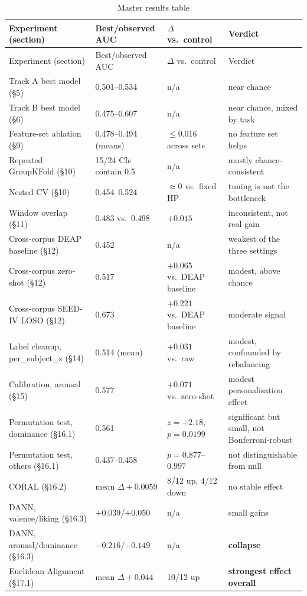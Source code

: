 \documentclass[11pt]{report}
\begin{document}
\begin{longtable}{p{5.5cm}p{2.3cm}p{2.1cm}p{4.3cm}}
\caption{Master results table} \label{tab:master} \\
\toprule
Experiment (section) & Best/observed AUC & $\Delta$ vs.\ control & Verdict \\
\midrule
\endfirsthead
\toprule
Experiment (section) & Best/observed AUC & $\Delta$ vs.\ control & Verdict \\
\midrule
\endhead
Track A best model (\S5) & 0.501--0.534 & n/a & near chance \\
Track B best model (\S6) & 0.475--0.607 & n/a & near chance, mixed by task \\
Feature-set ablation (\S9) & 0.478--0.494 (means) & $\le0.016$ across sets & no feature set helps \\
Repeated GroupKFold (\S10) & 15/24 CIs contain 0.5 & n/a & mostly chance-consistent \\
Nested CV (\S10) & 0.454--0.524 & $\approx0$ vs.\ fixed HP & tuning is not the bottleneck \\
Window overlap (\S11) & 0.483 vs.\ 0.498 & $+0.015$ & inconsistent, not real gain \\
Cross-corpus DEAP baseline (\S12) & 0.452 & n/a & weakest of the three settings \\
Cross-corpus zero-shot (\S12) & 0.517 & $+0.065$ vs.\ DEAP baseline & modest, above chance \\
Cross-corpus SEED-IV LOSO (\S12) & 0.673 & $+0.221$ vs.\ DEAP baseline & moderate signal \\
Label cleanup, per\_subject\_z (\S14) & 0.514 (mean) & $+0.031$ vs.\ raw & modest, confounded by rebalancing \\
Calibration, arousal (\S15) & 0.577 & $+0.071$ vs.\ zero-shot & modest personalisation effect \\
Permutation test, dominance (\S16.1) & 0.561 & $z=+2.18$, $p=0.0199$ & significant but small, not Bonferroni-robust \\
Permutation test, others (\S16.1) & 0.437--0.458 & $p=0.877$--$0.997$ & not distinguishable from null \\
CORAL (\S16.2) & mean $\Delta+0.0059$ & 8/12 up, 4/12 down & no stable effect \\
DANN, valence/liking (\S16.3) & $+0.039$/$+0.050$ & n/a & small gains \\
DANN, arousal/dominance (\S16.3) & $-0.216$/$-0.149$ & n/a & \textbf{collapse} \\
Euclidean Alignment (\S17.1) & mean $\Delta+0.044$ & 10/12 up & \textbf{strongest effect overall} \\

\end{longtable}
\end{document}

